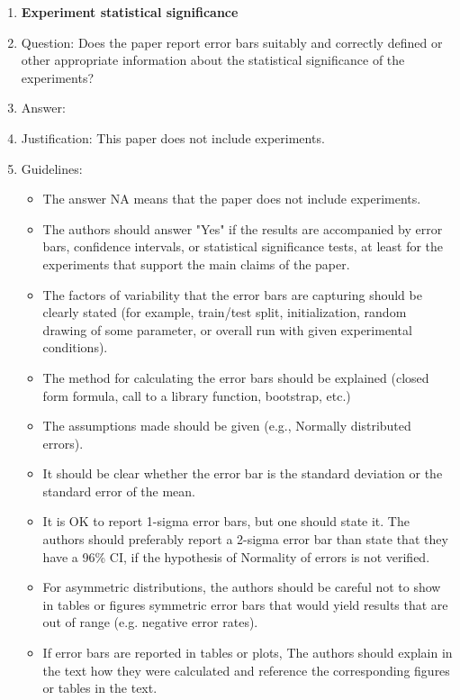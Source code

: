 \documentclass{article}
\begin{document}
\begin{enumerate}
\item {\bf Experiment statistical significance}
    \item[] Question: Does the paper report error bars suitably and correctly defined or other appropriate information about the statistical significance of the experiments?
    \item[] Answer: \answerNA{} %
    \item[] Justification: This paper does not include experiments.
    \item[] Guidelines:
    \begin{itemize}
        \item The answer NA means that the paper does not include experiments.
        \item The authors should answer "Yes" if the results are accompanied by error bars, confidence intervals, or statistical significance tests, at least for the experiments that support the main claims of the paper.
        \item The factors of variability that the error bars are capturing should be clearly stated (for example, train/test split, initialization, random drawing of some parameter, or overall run with given experimental conditions).
        \item The method for calculating the error bars should be explained (closed form formula, call to a library function, bootstrap, etc.)
        \item The assumptions made should be given (e.g., Normally distributed errors).
        \item It should be clear whether the error bar is the standard deviation or the standard error of the mean.
        \item It is OK to report 1-sigma error bars, but one should state it. The authors should preferably report a 2-sigma error bar than state that they have a 96\% CI, if the hypothesis of Normality of errors is not verified.
        \item For asymmetric distributions, the authors should be careful not to show in tables or figures symmetric error bars that would yield results that are out of range (e.g. negative error rates).
        \item If error bars are reported in tables or plots, The authors should explain in the text how they were calculated and reference the corresponding figures or tables in the text.
    \end{itemize}


\end{enumerate}
\end{document}
